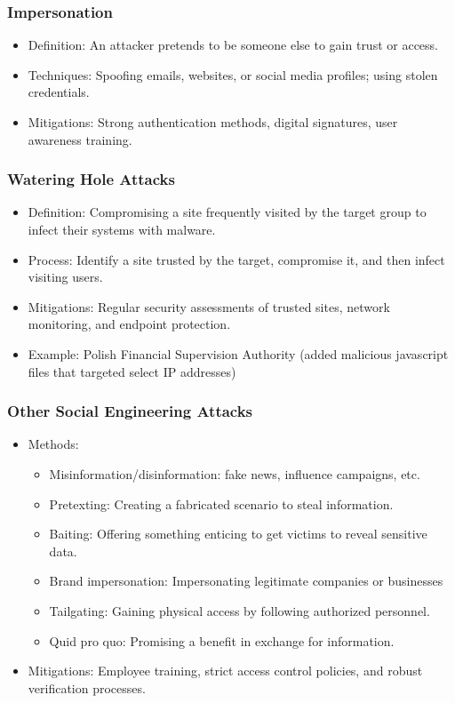 \documentclass[11pt]{article}
\begin{document}
\subsubsection{Impersonation}
\label{sec:org0547759}
\begin{itemize}
\item Definition: An attacker pretends to be someone else to gain trust or access.
\item Techniques: Spoofing emails, websites, or social media profiles; using stolen credentials.
\item Mitigations: Strong authentication methods, digital signatures, user awareness training.
\end{itemize}
\subsubsection{Watering Hole Attacks}
\label{sec:org32448d0}
\begin{itemize}
\item Definition: Compromising a site frequently visited by the target group to infect their systems with malware.
\item Process: Identify a site trusted by the target, compromise it, and then infect visiting users.
\item Mitigations: Regular security assessments of trusted sites, network monitoring, and endpoint protection.
\item Example: Polish Financial Supervision Authority (added malicious javascript files that targeted select IP addresses)
\end{itemize}
\subsubsection{Other Social Engineering Attacks}
\label{sec:org35fea68}
\begin{itemize}
\item Methods:
\begin{itemize}
\item Misinformation/disinformation: fake news, influence campaigns, etc.
\item Pretexting: Creating a fabricated scenario to steal information.
\item Baiting: Offering something enticing to get victims to reveal sensitive data.
\item Brand impersonation: Impersonating legitimate companies or businesses
\item Tailgating: Gaining physical access by following authorized personnel.
\item Quid pro quo: Promising a benefit in exchange for information.
\end{itemize}
\item Mitigations: Employee training, strict access control policies, and robust verification processes.
\end{itemize}
\end{document}
